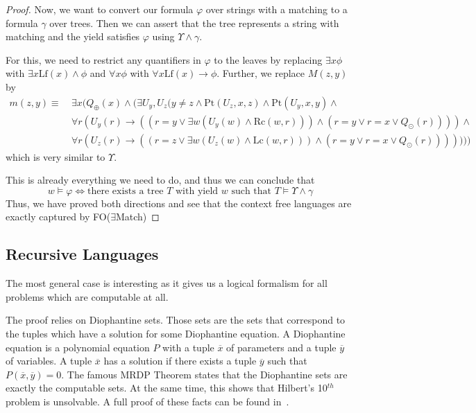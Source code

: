 \begin{proof}
    Now, we want to convert our formula $\varphi$ over strings with a matching to a formula $\gamma$ over trees.
    Then we can assert that the tree represents a string with matching and the yield satisfies $\varphi$ using $\Upsilon \land \gamma$.

    For this, we need to restrict any quantifiers in $\varphi$ to the leaves by replacing $\exists x \phi$ with $\exists x \text{Lf}(x) \land \phi$ and $\forall x \phi$ with $\forall x \text{Lf}(x) \to \phi$.
    Further, we replace $M(z, y)$ by
    \begin{align*}
        m(z, y) \equiv~& \exists x ( Q_{\oplus}(x) \land ( \exists U_y, U_z (y \neq z \land \text{Pt}(U_z, x, z) \land \text{Pt}(U_y, x, y) \land \\
        &\forall r (U_y(r) \to ((r = y \lor \exists w (U_y(w) \land \text{Rc}(w, r)))\land (r = y \lor r = x \lor Q_{\odot}(r)))) \land \\
        &\forall r (U_z(r) \to ((r = z \lor \exists w (U_z(w) \land \text{Lc}(w, r)))\land (r = y \lor r = x \lor Q_{\odot}(r)))))))
    \end{align*}
    which is very similar to $\Upsilon$.

    This is already everything we need to do, and thus we can conclude that
    \[w \models \varphi \Leftrightarrow \text{there exists a tree $T$ with yield $w$ such that } T \models \Upsilon \land \gamma \]
    Thus, we have proved both directions and see that the context free languages are exactly captured by FO($\exists$Match)
\end{proof}

\subsection{Recursive Languages}\label{subsec:des-recursive-languages}

The most general case is interesting as it gives us a logical formalism for all problems which are computable at all.

The proof relies on Diophantine sets.
Those sets are the sets that correspond to the tuples which have a solution for some Diophantine equation.
A Diophantine equation is a polynomial equation $P$ with a tuple $\overline{x}$ of parameters and a tuple $\overline{y}$ of variables.
A tuple $\overline{x}$ has a solution if there exists a tuple $\overline{y}$ such that $P(\overline{x}, \overline{y}) = 0$.
The famous MRDP Theorem states that the Diophantine sets are exactly the computable sets.
At the same time, this shows that Hilbert's 10$^{th}$ problem is unsolvable.
A full proof of these facts can be found in~\cite{Matijasevic1996}.

